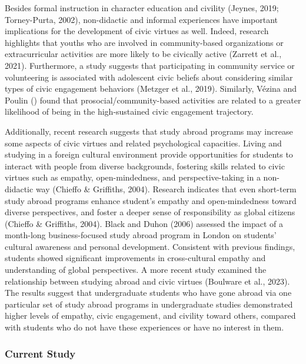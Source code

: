 \documentclass[
  man,
  floatsintext,
  longtable,
  nolmodern,
  notxfonts,
  notimes,
  colorlinks=true,linkcolor=blue,citecolor=blue,urlcolor=blue]{apa7}
\begin{document}
Besides formal instruction in character education and civility (Jeynes,
2019; Torney-Purta, 2002), non-didactic and informal experiences have
important implications for the development of civic virtues as well.
Indeed, research highlights that youths who are involved in
community-based organizations or extracurricular activities are more
likely to be civically active (Zarrett et al., 2021). Furthermore, a
study suggests that participating in community service or volunteering
is associated with adolescent civic beliefs about considering similar
types of civic engagement behaviors (Metzger et al., 2019). Similarly,
Vézina and Poulin
() found
that prosocial/community-based activities are related to a greater
likelihood of being in the high-sustained civic engagement trajectory.

Additionally, recent research suggests that study abroad programs may
increase some aspects of civic virtues and related psychological
capacities. Living and studying in a foreign cultural environment
provide opportunities for students to interact with people from diverse
backgrounds, fostering skills related to civic virtues such as empathy,
open-mindedness, and perspective-taking in a non-didactic way (Chieffo
\& Griffiths, 2004). Research indicates that even short-term study
abroad programs enhance student's empathy and open-mindedness toward
diverse perspectives, and foster a deeper sense of responsibility as
global citizens (Chieffo \& Griffiths, 2004). Black and Duhon (2006)
assessed the impact of a month-long business-focused study abroad
program in London on students' cultural awareness and personal
development. Consistent with previous findings, students showed
significant improvements in cross-cultural empathy and understanding of
global perspectives. A more recent study examined the relationship
between studying abroad and civic virtues (Boulware et al., 2023). The
results suggest that undergraduate students who have gone abroad via one
particular set of study abroad programs in undergraduate studies
demonstrated higher levels of empathy, civic engagement, and civility
toward others, compared with students who do not have these experiences
or have no interest in them.

\subsubsection{Current Study}\label{current-study}
\end{document}
